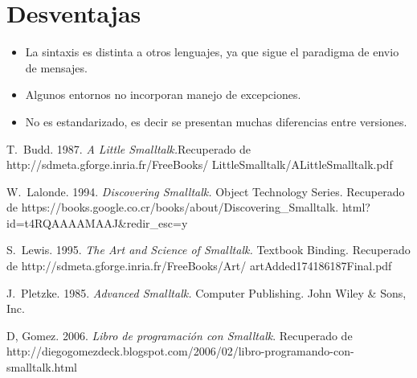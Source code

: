 \documentclass[10pt,journal,compsoc]{IEEEtran}
\begin{document}
\section{Desventajas}
\begin{itemize}
	\item La sintaxis es distinta a otros lenguajes, ya que sigue el paradigma de envio de mensajes.
	\item Algunos entornos no incorporan manejo de excepciones.
	\item No es estandarizado, es decir se presentan muchas diferencias entre versiones.
\end{itemize}

\begin{thebibliography}{3}
	
	T.~Budd. 1987. \emph{A Little Smalltalk.}Recuperado de http://sdmeta.gforge.inria.fr/FreeBooks/
	LittleSmalltalk/ALittleSmalltalk.pdf
	
	W.~Lalonde. 1994. \emph{Discovering Smalltalk.} Object Technology Series. Recuperado de https://books.google.co.cr/books/about/Discovering\_Smalltalk.
	html?id=t4RQAAAAMAAJ\&redir\_esc=y
		
	S.~Lewis. 1995. \emph{The Art and Science of Smalltalk.} Textbook Binding. Recuperado de http://sdmeta.gforge.inria.fr/FreeBooks/Art/
	artAdded174186187Final.pdf
	
	J.~Pletzke. 1985. \emph{Advanced Smalltalk.} Computer Publishing. John Wiley \& Sons, Inc.
	
	D, Gomez. 2006. \emph{Libro de programaci\'on con Smalltalk}. Recuperado de http://diegogomezdeck.blogspot.com/2006/02/libro-programando-con-smalltalk.html
	
\end{thebibliography}
\end{document}
